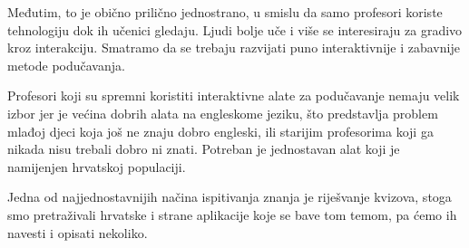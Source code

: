 \documentclass{scrreprt}
\begin{document}
Međutim, to je obično prilično jednostrano, u smislu da samo profesori koriste
tehnologiju dok ih učenici gledaju. Ljudi bolje uče i više se interesiraju za
gradivo kroz interakciju. Smatramo da se trebaju razvijati puno interaktivnije i
zabavnije metode podučavanja.

Profesori koji su spremni koristiti interaktivne alate za podučavanje nemaju velik
izbor jer je većina dobrih alata na engleskome jeziku, što predstavlja problem
mlađoj djeci koja još ne znaju dobro engleski, ili starijim profesorima koji ga
nikada nisu trebali dobro ni znati. Potreban je jednostavan alat koji je
namijenjen hrvatskoj populaciji.

Jedna od najjednostavnijih načina ispitivanja znanja je riješvanje kvizova,
stoga smo pretraživali hrvatske i strane aplikacije koje se bave tom temom, pa
ćemo ih navesti i opisati nekoliko.
\end{document}

